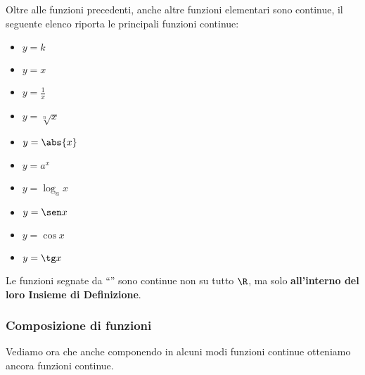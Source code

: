 


\noindent\begin{minipage}{\textwidth}
Oltre alle funzioni precedenti, anche altre funzioni elementari sono 
continue, il seguente elenco riporta le principali funzioni continue:

\noindent\begin{minipage}{1.05\textwidth}
\begin{multicols}{5}
\begin{itemize} [noitemsep]
 \item \(y=k\)
 \item \(y=x\)
 \item \(y=\frac{1}{x}\)  \textasteriskcentered
 \item \(y=\sqrt[n]{x}\)  \textasteriskcentered
 \item \(y=\abs{x}\)
 \item \(y=a^x\)
 \item \(y=\log_a x\)  \textasteriskcentered
 \item \(y=\sen x\)
 \item \(y=\cos x\)
 \item \(y=\tg x\)  \textasteriskcentered
\end{itemize}
\end{multicols}
\end{minipage}

\begin{osservazione}
Le funzioni segnate da ``\textasteriskcentered'' sono continue non su 
tutto \(\R\), 
ma solo \textbf{all'interno del loro Insieme di Definizione}.
\end{osservazione}
\end{minipage}

\subsubsection{Composizione di funzioni}
\label{subsubsec:cont_composizionefunzioni}

Vediamo ora che anche componendo in alcuni modi funzioni continue otteniamo 
ancora funzioni continue.

